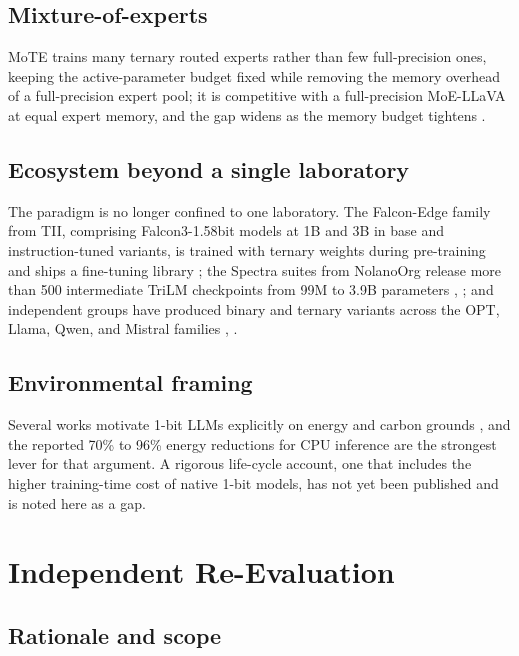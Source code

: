 \documentclass[11pt]{article}
\begin{document}
\subsection{Mixture-of-experts}

MoTE trains many ternary routed experts rather than few full-precision ones, keeping the
active-parameter budget fixed while removing the memory overhead of a full-precision
expert pool; it is competitive with a full-precision MoE-LLaVA at equal expert memory,
and the gap widens as the memory budget tightens \cite{Wang2025-MoTE}.

\subsection{Ecosystem beyond a single laboratory}

The paradigm is no longer confined to one laboratory. The Falcon-Edge family from TII,
comprising Falcon3-1.58bit models at 1B and 3B in base and instruction-tuned variants,
is trained with ternary weights during pre-training and ships a fine-tuning library
\cite{web-falconEdge}; the Spectra suites from NolanoOrg release more than 500 intermediate
TriLM checkpoints from 99M to 3.9B parameters \cite{Kaushal2024-Spectra},
\cite{Vaidhya2025-Spectra11}; and independent groups have produced binary and ternary
variants across the OPT, Llama, Qwen, and Mistral families \cite{Li2024-ARBLLM},
\cite{Dong2024-STBLLM,Xiao2025-PTQTP}.

\subsection{Environmental framing}

Several works motivate 1-bit LLMs explicitly on energy and carbon grounds
\cite{Wang2023-BitNet,Ansar2024-BEExformer}, and the reported 70\% to 96\% energy
reductions for CPU inference \cite{Wang2024-1bitAIInfra,web-bitnet2b4tCard} are the
strongest lever for that argument. A rigorous life-cycle account, one that includes the
higher training-time cost of native 1-bit models, has not yet been published and is
noted here as a gap.


\section{Independent Re-Evaluation}\label{sec:repro}

\subsection{Rationale and scope}
\end{document}
